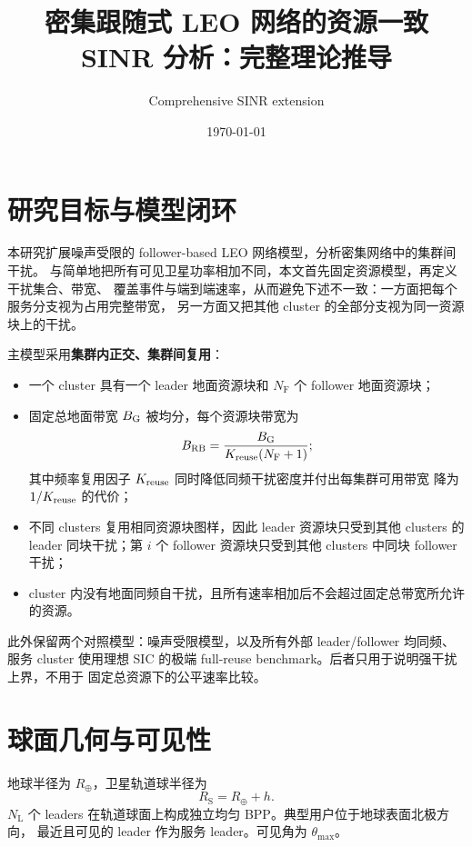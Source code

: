 \documentclass[UTF8,a4paper,11pt]{ctexart}
\title{密集跟随式 LEO 网络的资源一致 SINR 分析：完整理论推导}
\author{Comprehensive SINR extension}
\date{\today}
\newcommand{\NL}{N_{\mathrm L}}
\newcommand{\NF}{N_{\mathrm F}}
\newcommand{\Rearth}{R_{\oplus}}
\newcommand{\Rsat}{R_{\mathrm S}}
\newcommand{\thetam}{\theta_{\max}}
\begin{document}
\maketitle

\section{研究目标与模型闭环}

本研究扩展噪声受限的 follower-based LEO 网络模型，分析密集网络中的集群间干扰。
与简单地把所有可见卫星功率相加不同，本文首先固定资源模型，再定义干扰集合、带宽、
覆盖事件与端到端速率，从而避免下述不一致：一方面把每个服务分支视为占用完整带宽，
另一方面又把其他 cluster 的全部分支视为同一资源块上的干扰。

主模型采用\textbf{集群内正交、集群间复用}：
\begin{itemize}
  \item 一个 cluster 具有一个 leader 地面资源块和 $\NF$ 个 follower 地面资源块；
  \item 固定总地面带宽 $B_{\rm G}$ 被均分，每个资源块带宽为
  \begin{equation}
      B_{\rm RB}=\frac{B_{\rm G}}{K_{\rm reuse}(\NF+1)};
      \label{eq:rb-bandwidth}
  \end{equation}
  其中频率复用因子 $K_{\rm reuse}$ 同时降低同频干扰密度并付出每集群可用带宽
  降为 $1/K_{\rm reuse}$ 的代价；
  \item 不同 clusters 复用相同资源块图样，因此 leader 资源块只受到其他 clusters 的
  leader 同块干扰；第 $i$ 个 follower 资源块只受到其他 clusters 中同块 follower 干扰；
  \item cluster 内没有地面同频自干扰，且所有速率相加后不会超过固定总带宽所允许的资源。
\end{itemize}

此外保留两个对照模型：噪声受限模型，以及所有外部 leader/follower 均同频、服务
cluster 使用理想 SIC 的极端 full-reuse benchmark。后者只用于说明强干扰上界，不用于
固定总资源下的公平速率比较。

\section{球面几何与可见性}

地球半径为 $\Rearth$，卫星轨道球半径为
\begin{equation}
    \Rsat=\Rearth+h.
\end{equation}
$\NL$ 个 leaders 在轨道球面上构成独立均匀 BPP。典型用户位于地球表面北极方向，
最近且可见的 leader 作为服务 leader。可见角为 $\thetam$。
\end{document}
